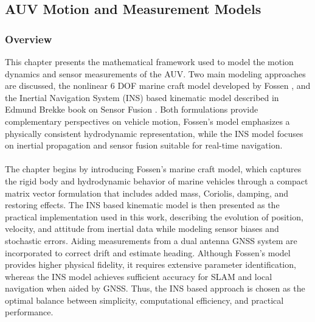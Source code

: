 \subsection{AUV Motion and Measurement Models}
\subsubsection{Overview}
This chapter presents the mathematical framework used to model the motion dynamics and sensor measurements of the AUV. Two main modeling approaches are discussed, the nonlinear 6 DOF marine craft model developed by Fossen \cite{fossen_marine_craft_model}, and the Inertial Navigation System (INS) based kinematic model described in Edmund Brekke book on Sensor Fusion \cite{sensor_fusion_book}. Both formulations provide complementary perspectives on vehicle motion, Fossen's model emphasizes a physically consistent hydrodynamic representation, while the INS model focuses on inertial propagation and sensor fusion suitable for real-time navigation.  
\\ \\
The chapter begins by introducing Fossen's marine craft model, which captures the rigid body and hydrodynamic behavior of marine vehicles through a compact matrix vector formulation that includes added mass, Coriolis, damping, and restoring effects. The INS based kinematic model is then presented as the practical implementation used in this work, describing the evolution of position, velocity, and attitude from inertial data while modeling sensor biases and stochastic errors. Aiding measurements from a dual antenna GNSS system are incorporated to correct drift and estimate heading. Although Fossen's model provides higher physical fidelity, it requires extensive parameter identification, whereas the INS model achieves sufficient accuracy for SLAM and local navigation when aided by GNSS. Thus, the INS based approach is chosen as the optimal balance between simplicity, computational efficiency, and practical performance.



